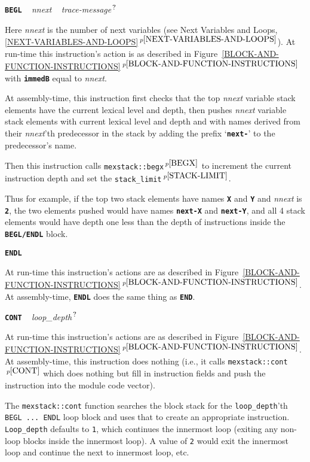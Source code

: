 \documentclass[12pt]{article}
\makeatletter
\newcommand{\TT}[1]{{\tt \bfseries #1}}
\newcommand{\QMARK}{{$^{\,\mbox{\footnotesize ?}}$}}
\newcommand{\ttkey}[1]{\TT{#1}\index{#1@{\tt #1}}}
\newcommand{\itemref}[1]{\ref{#1}$\,^{p\pageref{#1}}$}
\newcommand{\pagnote}[1]{$\,^{p\pageref{#1}}$}
\newenvironment{indpar}[1][0.3in]%
	{\begin{list}{}%
		     {\setlength{\itemsep}{0in}%
		      \setlength{\topsep}{0in}%
		      \setlength{\parsep}{1ex}%
		      \setlength{\labelwidth}{#1}%
		      \setlength{\leftmargin}{#1}%
		      \addtolength{\leftmargin}{\labelsep}}%
	 \item}%
	{\end{list}}
\makeatother
\begin{document}
\ttkey{BEGL} ~ {\em nnext} ~ {\em trace-message}\QMARK{}
\begin{indpar}
Here {\em nnext} is the number of next variables
(see Next Variables and Loops, \itemref{NEXT-VARIABLES-AND-LOOPS}).
At run-time this instruction's action is as described in
Figure~\itemref{BLOCK-AND-FUNCTION-INSTRUCTIONS} with \TT{immedB} equal
to {\em nnext}.

At assembly-time, this instruction first checks that the
top {\em nnext} variable stack elements have the current lexical level
and depth,
then pushes {\em nnext} variable stack elements with current lexical
level and depth
and with names derived from their {\em nnext}'th predecessor
in the stack by adding the prefix `\TT{next-}'\label{NEXT-VARIABLE}
to the predecessor's
name.

Then this instruction calls
{\tt mexstack::begx}\pagnote{BEGX} to increment
the current instruction depth and set the
{\tt stack\_limit}\pagnote{STACK-LIMIT}.

Thus for example, if the top two stack elements have names
\TT{X} and \TT{Y} and {\em nnext} is \TT{2}, the two elements
pushed would have names \TT{next-X} and \TT{next-Y}, and
all 4 stack elements would have depth one less than the depth
of instructions inside the \TT{BEGL/ENDL} block.
\end{indpar}

\ttkey{ENDL}
\begin{indpar}
At run-time this instruction's actions are as described in
Figure~\itemref{BLOCK-AND-FUNCTION-INSTRUCTIONS}.  At assembly-time,
\TT{ENDL} does the same thing as \TT{END}.
\end{indpar}

\ttkey{CONT} ~ {\em loop\_depth}\QMARK{}
\begin{indpar}
At run-time this instruction's actions are as described in
Figure~\itemref{BLOCK-AND-FUNCTION-INSTRUCTIONS}.  At assembly-time,
this instruction does nothing (i.e., it calls {\tt mexstack::cont}\pagnote{CONT}
which does nothing but fill in instruction fields and push the instruction
into the module code vector).

The {\tt mexstack::cont} function
searches the block stack for the {\tt loop\_depth}'th {\tt BEGL ...~ENDL}
loop block and uses that to create an appropriate instruction.
{\tt Loop\_depth} defaults to {\tt 1}, which continues the innermost
loop (exiting any non-loop blocks inside the innermost loop).
A value of {\tt 2} would exit the innermost loop and continue
the next to innermost loop, etc.
\end{indpar}
\end{document}
